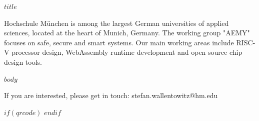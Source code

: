 \documentclass[a4,14pt]{scrreprt}
\begin{document}
\par
{}%
\hfill
{}%
\par

\pagestyle{empty}

\vspace{1cm}

\begin{center}
\begin{minipage}[t]{.9\textwidth}
  \centering
{\Huge \textbf{$title$}}
\end{minipage}
\end{center}

\vspace{1cm}

Hochschule München is among the largest German universities of applied sciences,
located at the heart of Munich, Germany. The working group "AEMY" focuses on
safe, secure and smart systems. Our main working areas include RISC-V processor
design, WebAssembly runtime development and open source chip design tools.

$body$

\vfill

\begin{minipage}[t]{.5\textwidth}
  If you are interested, please get in touch: stefan.wallentowitz@hm.edu
\end{minipage}
\hfill
\begin{minipage}[t]{.3\textwidth}
  \hfill
  $if(qrcode)$  $endif$
\end{minipage}
\end{document}

